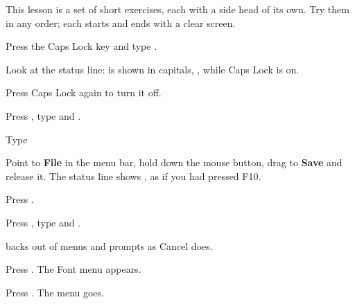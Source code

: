 This lesson is a set of short exercises, each with a side head of its own.
Try them in any order; each starts and ends with a clear screen.

\begin{WPSteps}
\item Press the Caps Lock key and type .
\item Look at the status line:  is shown in capitals, ,
while Caps Lock is on.
\end{WPSteps}
\begin{WPSteps}[resume]
\item Press Caps Lock again to turn it off.
\item Press , type  and .
\end{WPSteps}

\begin{WPSteps}
\item Type 
\item Point to \textbf{File} in the menu bar, hold down the mouse button,
drag to \textbf{Save} and release it.  The status line
shows , as if you had pressed F10.
\item Press .
\item Press , type  and .
\end{WPSteps}

 backs out of menus and prompts as Cancel does.
\begin{WPSteps}
\item Press .  The Font menu appears.
\item Press .  The menu goes.
\end{WPSteps}


